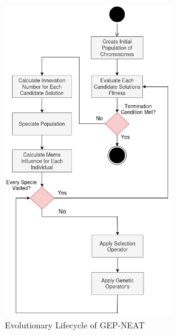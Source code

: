 \begin{figure}[H] %
	\centering %
	\includegraphics[width=0.65\textwidth]{Figures/chapter_gep_neat/gep_neat_framework.png} %
	\caption{Evolutionary Lifecycle of GEP-NEAT}
	\label{fig:gep_neat_framework} %
\end{figure}

